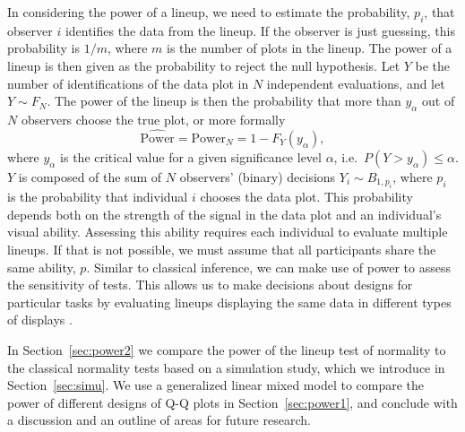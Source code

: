 \documentclass[12pt]{article}\usepackage[]{graphicx}\usepackage[]{color}
\newcommand{\al}[1]{{\color{ForestGreen} #1}}
\newcommand{\alnote}[1]{\todo[inline,color=green!40]{#1}}
\begin{document}
In considering the power of a lineup, we need to estimate the probability, $p_i$, that observer $i$ identifies the data from the lineup. If the observer is just guessing, this probability is $1/m$, where $m$ is the number of plots in the lineup.
The power of a lineup is then given as the probability to reject the null hypothesis. Let $Y$ be the number of identifications of the data plot in $N$ independent evaluations, and let $Y \sim F_N$. The power of the lineup is then the probability that more than $y_\alpha$ out of $N$ observers
choose the true plot, or more formally
\begin{equation}\label{eqn:power}
\widehat{\text{Power}} = \text{Power}_{N} = 1 - F_{Y} (y_{\alpha}),
\end{equation}
where $y_\alpha$ is the critical value for a given significance level $\alpha$, i.e.~$P(Y >  y_{\alpha}) \le \alpha$. $Y$ is composed of the sum of $N$ observers' (binary) decisions $Y_i \sim B_{1, p_i}$, where  $p_i$ is the probability that individual $i$ chooses the data plot. This probability  depends both on the strength of the signal in the data plot and an individual's visual ability.
Assessing this ability requires each individual to evaluate multiple lineups. 
If that is not possible, we must assume that all participants share the same ability, $p$. %
Similar to classical inference, we can make use of power to assess the sensitivity of tests. This allows us to make decisions about designs for particular tasks by evaluating lineups displaying  the same data in different types of displays \citep{Hofmann:2012ts}. 


In Section~\ref{sec:power2} we compare the power of the lineup test of normality to the classical normality tests
based on a simulation study, which we introduce in Section~\ref{sec:simu}. We use a generalized linear mixed model to compare the power of different designs  of Q-Q plots in Section~\ref{sec:power1}, %
and conclude with a discussion and an outline of areas for future research.
\end{document}
